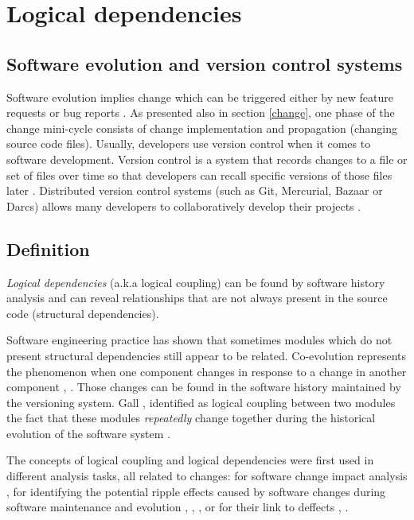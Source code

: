 \documentclass[12pt]{mitthesis}
\begin{document}
\section{Logical dependencies}
\subsection{Software evolution and version control systems}
Software evolution implies change which can be triggered either by new feature requests or bug reports \cite{articleEvolution}. As presented also in section \ref{change}, one phase of the change mini-cycle consists of change implementation and propagation (changing source code files). 
Usually, developers use version control when it comes to software development. Version control is a system that records changes to a file or set of files over time so that developers can recall specific versions of those files later \cite{svn}.
Distributed version control systems (such as Git, Mercurial, Bazaar or Darcs) allows many developers to collaboratively develop their projects \cite{7471284}.

\subsection{Definition}
\textit{Logical dependencies} (a.k.a logical coupling) can be found by software history analysis and can reveal relationships that are not always present in the source code (structural dependencies).  

Software engineering practice has shown that sometimes modules which do not present structural dependencies still appear to be related. Co-evolution represents the phenomenon when one component changes in response to a change in another component \cite{Yu:2007:UCC:1231330.1231370}, \cite{5166450}. Those changes can be found in the software history maintained by the versioning system. Gall \cite{Gall:1998:DLC:850947.853338}, \cite{Gall:2003:CRH:942803.943741} identified as logical coupling between two modules the fact that these modules  \textit{repeatedly} change together during the historical evolution of the software system \cite{6606615}.

The concepts of logical coupling and logical dependencies were first used in different analysis tasks, all related to changes: for software change impact analysis \cite{1553643}, for identifying the potential ripple effects caused by software changes during software maintenance and evolution \cite{DBLP:conf/issre/OlivaG15}, \cite{Oliva:2011:ISL:2067853.2068086}, \cite{Poshyvanyk2009}, \cite{posh2010} or for their link to deffects \cite{wiese}, \cite{Zimmermann:2004:MVH:998675.999460}.
\end{document}
